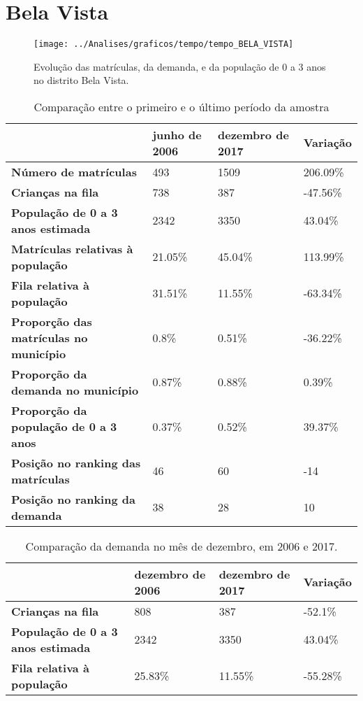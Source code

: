 \section{Bela Vista}
\begin{figure}[H]
\centering
\texttt{[image: ../Analises/graficos/tempo/tempo\_BELA\_VISTA]}
\caption{Evolução das matrículas, da demanda, e da população de 0 a 3 anos no distrito Bela Vista.}
\end{figure}
\begin{table}[H]
\begin{tabular}{|l|l|l|l|}
\hline
\textbf{}                                      & \textbf{junho de 2006}       & \textbf{dezembro de 2017}    & \textbf{Variação} \\ \hline
\textbf{Número de matrículas}                  & 493 & 1509 & 206.09\% \\ \hline
\textbf{Crianças na fila}                      & 738 & 387 & -47.56\% \\ \hline
\textbf{População de 0 a 3 anos estimada}      & 2342 & 3350 & 43.04\% \\ \hline
\textbf{Matrículas relativas à população}      & 21.05\% & 45.04\% & 113.99\% \\ \hline
\textbf{Fila relativa à população}             & 31.51\% & 11.55\% & -63.34\% \\ \hline
\textbf{Proporção das matrículas no município} & 0.8\% & 0.51\% & -36.22\% \\ \hline
\textbf{Proporção da demanda no município}     & 0.87\% & 0.88\% & 0.39\% \\ \hline
\textbf{Proporção da população de 0 a 3 anos}  & 0.37\% & 0.52\% & 39.37\% \\ \hline
\textbf{Posição no ranking das matrículas}     & 46 & 60 & -14 \\ \hline
\textbf{Posição no ranking da demanda}         & 38 & 28 & 10 \\ \hline
\end{tabular}
\caption{Comparação entre o primeiro e o último período da amostra}
\end{table}
\begin{table}[H]
\begin{tabular}{|l|l|l|l|}
\hline
\textbf{}                                 & \textbf{dezembro de 2006} & \textbf{dezembro de 2017} & \textbf{Variação} \\ \hline
\textbf{Crianças na fila}                      & 808 & 387 & -52.1\% \\ \hline
\textbf{População de 0 a 3 anos estimada}      & 2342 & 3350 & 43.04\% \\ \hline
\textbf{Fila relativa à população}             & 25.83\% & 11.55\% & -55.28\% \\ \hline
\end{tabular}
\caption{Comparação da demanda no mês de dezembro, em 2006 e 2017.}
\end{table}
